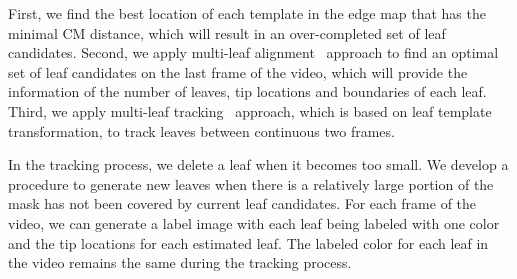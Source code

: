 First, we find the best location of each template in the edge map that has the minimal CM distance, which will result in an over-completed set of leaf candidates.
Second, we apply multi-leaf alignment~\cite{yin2014a} approach to find an optimal set of leaf candidates on the last frame of the video, which will provide the information of the number of leaves, tip locations and boundaries of each leaf.
Third, we apply multi-leaf tracking~\cite{yin2014b} approach, which is based on leaf template transformation, to track leaves between continuous two frames.

In the tracking process, we delete a leaf when it becomes too small.
We develop a procedure to generate new leaves when there is a relatively large portion of the mask has not been covered by current leaf candidates.
For each frame of the video, we can generate a label image with each leaf being labeled with one color and the tip locations for each estimated leaf.
The labeled color for each leaf in the video remains the same during the tracking process.


